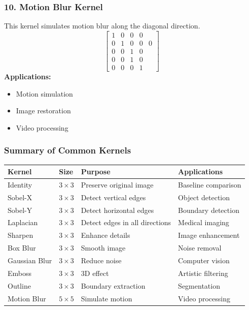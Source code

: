 \documentclass[11pt]{article}
\begin{document}
\subsubsection*{10. Motion Blur Kernel}
This kernel simulates motion blur along the diagonal direction. 
$$ \begin{bmatrix} 1 & 0 & 0 & 0 \\ 0 & 1 & 0 & 0 & 0 \\ 0 & 0 & 1 & 0 \\ 0 & 0 & 1 & 0 \\ 0 & 0 & 0 & 1 \end{bmatrix} $$
\textbf{Applications:}
\begin{itemize}
    \item Motion simulation 
    \item Image restoration 
    \item Video processing 
\end{itemize}

\subsubsection*{Summary of Common Kernels}
\begin{table}[h!]
    \centering
    \begin{tabular}{|l|l|l|p{4cm}|}
        \hline
        \textbf{Kernel} & \textbf{Size} & \textbf{Purpose} & \textbf{Applications} \\ \hline
        Identity & $3\times3$ & Preserve original image & Baseline comparison \\ \hline 
        Sobel-X & $3\times3$ & Detect vertical edges & Object detection \\ \hline 
        Sobel-Y & $3\times3$ & Detect horizontal edges & Boundary detection \\ \hline 
        Laplacian & $3\times3$ & Detect edges in all directions & Medical imaging \\ \hline 
        Sharpen & $3\times3$ & Enhance details & Image enhancement \\ \hline 
        Box Blur & $3\times3$ & Smooth image & Noise removal \\ \hline 
        Gaussian Blur & $3\times3$ & Reduce noise & Computer vision \\ \hline 
        Emboss & $3\times3$ & 3D effect & Artistic filtering \\ \hline 
        Outline & $3\times3$ & Boundary extraction & Segmentation \\ \hline 
        Motion Blur & $5\times5$ & Simulate motion & Video processing \\ \hline 
    \end{tabular}
\end{table}
\end{document}
